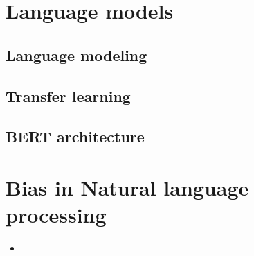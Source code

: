\section{Language models}
\subsection{Language modeling}
\subsection{Transfer learning}
\subsection{BERT architecture}
\section{Bias in Natural language processing}
\begin{itemize}
    \item 
\end{itemize}